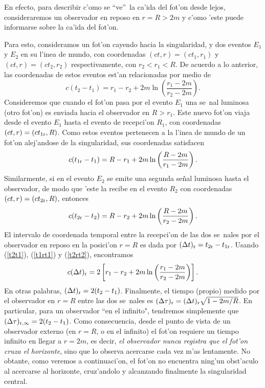 En efecto, para describir c'omo se ``ve''\, la ca'ida del fot'on desde lejos, consideraremos un observador en reposo en $r=R>2m$ y c'omo 'este puede informarse sobre la ca'ida del fot'on.

Para esto, consideramos un fot'on cayendo hacia la singularidad, y dos eventos $E_1$ y $E_2$ en su l'inea de mundo, con coordenadas $(ct,r)=(ct_1,r_1)$ y $(ct,r)=(ct_2,r_2)$ respectivamente, con $r_2<r_1<R$. De acuerdo a lo anterior, las coordenadas de estos eventos est'an relacionadas por medio de
\begin{equation}
c(t_2-t_1)=r_1-r_2+2m\ln\left(\frac{r_1-2m}{r_2-2m}\right). \label{t2t1}
\end{equation}
Consideremos que cuando el fot'on pasa por el evento $E_1$ una se~nal luminosa (otro fot'on) es enviada hacia el observador en $R>r_1$. Este nuevo fot'on viaja desde el evento $E_1$ hasta el evento de recepci'on $R_1$, con coordenadas $(ct,r)=(ct_{1\rm r},R)$. Como estos eventos pertenecen a la l'inea de mundo de un fot'on alej'andose de la singularidad, sus coordenadas satisfacen
\begin{equation}
c(t_{1 \rm r}-t_1)=R-r_1+2m\ln\left(\frac{R-2m}{r_1-2m}\right).\label{t1rt1}
\end{equation}
Similarmente, si en el evento $E_2$ se emite una segunda se\~nal luminosa hasta el observador, de modo que 'este la recibe en el evento $R_2$ con coordenadas $(ct,r)=(ct_{2\rm r},R)$, entonces
\begin{equation}
c(t_{2 \rm r}-t_2)=R-r_2+2m\ln\left(\frac{R-2m}{r_2-2m}\right).\label{t2rt2}
\end{equation}
El intervalo de coordenada temporal entre la recepci'on de las dos se~nales por el observador en reposo en la posici'on $r=R$ es dada por $(\Delta t)_{\rm r}=t_{2 \rm r}-t_{1 \rm r}$. Usando (\ref{t2t1}), (\ref{t1rt1}) y (\ref{t2rt2}), encontramos
\begin{equation}
c(\Delta t)_{\rm r}=2\left[r_1-r_2+2m\ln\left(\frac{r_1-2m}{r_2-2m}\right)\right].
\end{equation}
En otras palabras, $(\Delta t)_{\rm r}=2(t_2-t_1)$. Finalmente, el tiempo (propio) medido por el observador en $r=R$ entre las dos se~nales es $(\Delta\tau)_{\rm r}=(\Delta t)_{\rm r}\sqrt{1-2m/R}$. En particular, para un observador ``en el infinito", tendremos simplemente que
$(\Delta\tau)_{{\rm r},\infty}=2(t_2-t_1)$. Como consecuencia, desde el punto de vista de un observador externo (en $r=R$, o en el infinito) el fot'on requiere un tiempo infinito en llegar a $r=2m$, es decir, \textit{el observador nunca registra que el fot'on cruza el horizonte}, sino que lo observa acercarse cada vez m'as lentamente. No obtante, como veremos a continuaci'on, el fot'on no encuentra ning'un obst'aculo al acercarse al horizonte, cruz'andolo y alcanzando finalmente la singularidad central.

